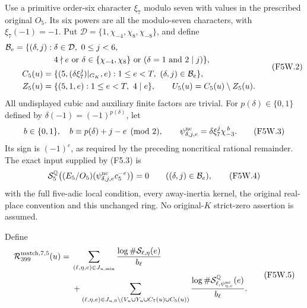 Use a primitive order-six character $\xi_7$ modulo seven with
values in the prescribed original $O_5$. Its six powers are all
the modulo-seven characters, with $\xi_7(-1)=-1$.
Put $\mathcal D=\{1,\chi_{-4},\chi_8,\chi_{-8}\}$, and define
\[
 \begin{split}
 \mathcal B_e=\{(\delta,j):{}&\delta\in\mathcal D,\ 0\leq j<6,\\
 &4\nmid e\ \hbox{or }\delta\in\{\chi_{-4},\chi_8\}
           \ \hbox{or }(\delta=1\hbox{ and }2\mid j)\},\\
 C_5(u)={}&\{(5,(\delta\xi_7^j)|_{G_K},e):
                              1\leq e<T,\ (\delta,j)\in\mathcal B_e\},\\
 Z_5(u)={}&\{(5,1,e):1\leq e<T,\ 4\mid e\},\qquad
 U_5(u)=C_5(u)\setminus Z_5(u).
 \end{split}\tag{F5W.2}
\]
All undisplayed cubic and auxiliary finite factors are trivial.
For $p(\delta)\in\{0,1\}$ defined by
$\delta(-1)=(-1)^{p(\delta)}$, let
\[
 b\in\{0,1\},\quad b\equiv p(\delta)+j-e\pmod2,\qquad
 \psi^{\rm nc}_{\delta,j,e}=\delta\xi_7^j\chi_{-3}^{\,b}.
 \tag{F5W.3}
\]
Its sign is $(-1)^e$, as required by the preceding noncritical
rational remainder. The exact input supplied by (F5.3) is
\[
 \mathcal S^{\mathbb Q}_5\bigl((E_5/O_5)
           (\psi^{\rm nc}_{\delta,j,e}c_5^{-e})\bigr)=0
                        \qquad((\delta,j)\in\mathcal B_e),
 \tag{F5W.4}
\]
with the full five-adic local condition, every away-inertia kernel,
the original real-place convention and this unchanged ring.
No original-$K$ strict-zero assertion is assumed.

Define
\[
 \begin{split}
 \mathcal R_{399}^{\rm match,7,5}(u)={}&
 \sum_{(\ell,\eta,e)\in J_{u,\rm mix}}
                         \frac{\log\#\mathcal S_{\ell,\eta}(e)}{b_\ell}\\
 &+\sum_{(\ell,\eta,e)\in
       J_{u,0}\setminus(V_u\cup Y_u\cup C_7(u)\cup C_5(u))}
      \frac{\log\#\mathcal S^{\mathbb Q}_{\ell,
                              \psi_{\eta,e}^{\rm nc}}(e)}{b_\ell}.
 \end{split}\tag{F5W.5}
\]

